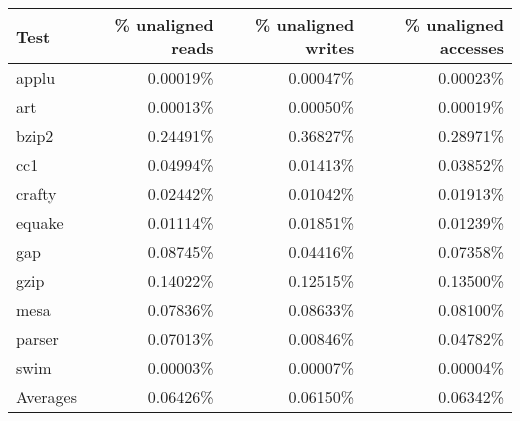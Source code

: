 \begin{tabular}{lrrr}
\hline
Test & \% unaligned reads & \% unaligned writes & \% unaligned accesses \\
\hline
applu & 0.00019\% & 0.00047\% & 0.00023\%  \\
\hline
art & 0.00013\% & 0.00050\% & 0.00019\%  \\
\hline
bzip2 & 0.24491\% & 0.36827\% & 0.28971\%  \\
\hline
cc1 & 0.04994\% & 0.01413\% & 0.03852\%  \\
\hline
crafty & 0.02442\% & 0.01042\% & 0.01913\%  \\
\hline
equake & 0.01114\% & 0.01851\% & 0.01239\%  \\
\hline
gap & 0.08745\% & 0.04416\% & 0.07358\%  \\
\hline
gzip & 0.14022\% & 0.12515\% & 0.13500\%  \\
\hline
mesa & 0.07836\% & 0.08633\% & 0.08100\%  \\
\hline
parser & 0.07013\% & 0.00846\% & 0.04782\%  \\
\hline
swim & 0.00003\% & 0.00007\% & 0.00004\%  \\
\hline
{}Averages & 0.06426\% & 0.06150\% & 0.06342\%  \\
\hline
\end{tabular}

